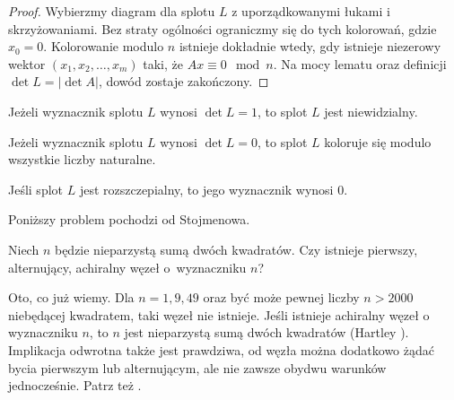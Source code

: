 \begin{proof}
    Wybierzmy diagram dla splotu $L$ z uporządkowanymi łukami i skrzyżowaniami.
    Bez straty ogólności ograniczmy się do tych kolorowań, gdzie $x_0 = 0$.
    Kolorowanie modulo $n$ istnieje dokładnie wtedy, gdy istnieje niezerowy wektor $(x_1, x_2, \ldots, x_m)$ taki, że $Ax \equiv 0 \mod n$.
    Na mocy lematu oraz definicji $\det L = |\det A|$, dowód zostaje zakończony.
\end{proof}

\begin{corollary}
%
    Jeżeli wyznacznik splotu $L$ wynosi $\det L = 1$, to splot $L$ jest niewidzialny.
\end{corollary}

\begin{corollary}
    Jeżeli wyznacznik splotu $L$ wynosi $\det L = 0$, to splot $L$ koloruje się modulo wszystkie liczby naturalne.
\end{corollary}

\begin{corollary}
%
    Jeśli splot $L$ jest rozszczepialny, to jego wyznacznik wynosi $0$.
\end{corollary}

Poniższy problem pochodzi od Stojmenowa.
%

\begin{conjecture}
    Niech $n$ będzie nieparzystą sumą dwóch kwadratów.
    Czy istnieje pierwszy, alternujący, achiralny węzeł o~wyznaczniku $n$?
\end{conjecture}

Oto, co już wiemy.
Dla $n = 1, 9, 49$ oraz być może pewnej liczby $n > 2000$ niebędącej kwadratem, taki węzeł nie istnieje.
Jeśli istnieje achiralny węzeł o wyznaczniku $n$, to $n$ jest nieparzystą sumą dwóch kwadratów (Hartley \cite{hartley1979}).
%
Implikacja odwrotna także jest prawdziwa, od węzła można dodatkowo żądać bycia pierwszym lub alternującym, ale nie zawsze obydwu warunków jednocześnie.
Patrz też \cite{stoimenow2005}.
%


